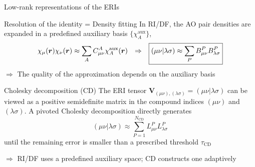 \documentclass[aspectratio=169,9pt]{beamer}
\newcommand{\br}{\boldsymbol{r}}
\newcommand{\bV}{\boldsymbol{V}}
\newcommand{\rbraket}[2]{( #1 | #2 )}
\begin{document}
\begin{frame}{Low-rank representations of the ERIs}
	\begin{block}{Resolution of the identity = Density fitting}
		In RI/DF, the AO pair densities are expanded in a
		\alert{predefined auxiliary basis} $\{\chi_A^\text{aux}\}$,
		\begin{equation*}
			\chi_\mu(\br)\chi_\nu(\br)
			\approx
			\sum_A C_{\mu\nu}^A \chi_A^\text{aux}(\br)
			\qq{$\Rightarrow$}
			\boxed{
				\rbraket{\mu\nu}{\lambda\sigma}
				\approx
				\sum_P
				B_{\mu\nu}^P B_{\lambda\sigma}^P
			}
		\end{equation*}
		$\Rightarrow$ \alert{The quality of the approximation depends on the auxiliary basis}
	\end{block}
	\vfill
	\begin{block}{Cholesky decomposition (CD)}
		The ERI tensor $\bV_{(\mu\nu),(\lambda\sigma)} = \rbraket{\mu\nu}{\lambda\sigma}$ can be viewed as a positive semidefinite matrix
		in the compound indices $(\mu\nu)$ and $(\lambda\sigma)$.
		A pivoted Cholesky decomposition directly generates
		\begin{equation*}
			\boxed{
				\rbraket{\mu\nu}{\lambda\sigma}
				\approx
				\sum_{P=1}^{N_\text{CD}}
				L_{\mu\nu}^{P} L_{\lambda\sigma}^{P}
			}
		\end{equation*}
		until the remaining error is smaller than a prescribed threshold $\tau_\text{CD}$
	\end{block}
	\vfill
	\centering
	$\Rightarrow$
	\alert{RI/DF uses a predefined auxiliary space; CD constructs one adaptively}
\end{frame}

\end{document}
